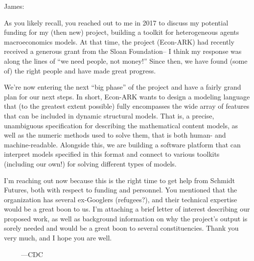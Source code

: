 \documentclass[12pt,pdftex,letterpaper]{article}
\begin{document}
	\pagestyle{empty}
	
James:

As you likely recall, you reached out to me in 2017 to discuss my potential funding for my (then new) project, building a toolkit for heterogeneous agents macroeconomics models. At that time, the project (Econ-ARK) had recently received a generous grant from the Sloan Foundation-- I think my response was along the lines of ``we need people, not money!'' Since then, we have found (some of) the right people and have made great progress.

We're now entering the next ``big phase'' of the project and have a fairly grand plan for our next steps. In short, Econ-ARK wants to design a modeling language that (to the greatest extent possible) fully encompasses the wide array of features that can be included in dynamic structural models. That is, a precise, unambiguous specification for describing the mathematical content models, as well as the numeric methods used to solve them, that is both human- and machine-readable. Alongside this, we are building a software platform that can interpret models specified in this format and connect to various toolkits (including our own!) for solving different types of models.

I'm reaching out now because this is the right time to get help from Schmidt Futures, both with respect to funding and personnel. You mentioned that the organization has several ex-Googlers (refugees?), and their technical expertise would be a great boon to us. I'm attaching a brief letter of interest describing our proposed work, as well as background information on why the project's output is sorely needed and would be a great boon to several constituencies. Thank you very much, and I hope you are well.

~~~~~---CDC
\end{document}
